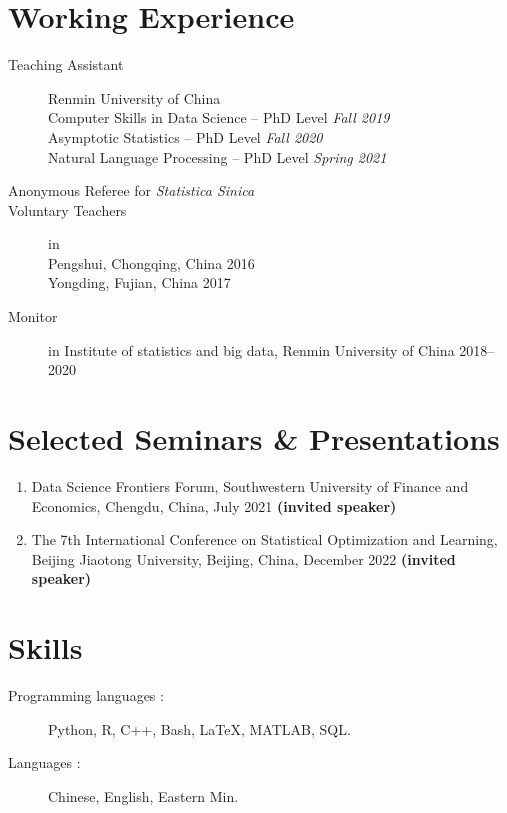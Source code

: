 \documentclass[margin,line]{resume-bib}
\begin{document}
\begin{resume}
\section{\mysidestyle Working Experience}\vspace{1mm}	     
\begin{description}
    \item[Teaching Assistant]\small{Renmin University of China} \\
            Computer Skills in Data Science -- PhD Level \hfill \textsl{Fall 2019} \\
            Asymptotic Statistics -- PhD Level \hfill \textsl{Fall 2020} \\
            Natural Language Processing -- PhD Level \hfill \textsl{Spring 2021} 
    \item[Anonymous Referee for {\it  Statistica Sinica}]
    \item[Voluntary Teachers] in \\
    Pengshui, Chongqing, China \hfill 2016 \\
    Yongding, Fujian, China \hfill 2017
    \item[Monitor] in Institute of statistics and big data, Renmin University of China \hfill 2018--2020
\end{description}

\section{\mysidestyle Selected Seminars {\footnotesize \&} Presentations} \vspace{1mm}	\vspace{1mm}	

\begin{enumerate}
\item Data Science Frontiers Forum, Southwestern University of Finance and Economics, Chengdu, China, July 2021 {\bf (invited speaker)}
\item The 7th International Conference on Statistical Optimization and Learning, Beijing Jiaotong University, Beijing, China, December 2022 {\bf (invited speaker)}
\end{enumerate}

\section{\mysidestyle Skills}\vspace{1mm}	  
\begin{description}
			\item[Programming languages $\!\!:$] Python, R, C++, Bash, \LaTeX, MATLAB, SQL.
			\item[Languages $\!\!:$] Chinese, English, Eastern Min.
\end{description}


\end{resume}
\end{document}
